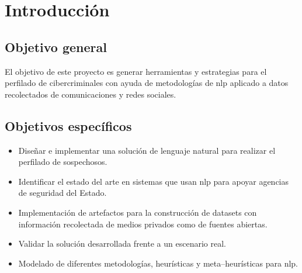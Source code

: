 \chapter{Introducción} %

\label{chIntroduction} %


\section{Objetivo general}
El objetivo de este proyecto es generar herramientas y estrategias para el perfilado de cibercriminales con ayuda de metodologías de \gls{nlp} aplicado a datos recolectados de comunicaciones y redes sociales.

\section{Objetivos específicos}
\begin{itemize}
  
\item Diseñar e implementar una solución de lenguaje natural para realizar el perfilado de sospechosos.

\item Identificar el estado del arte en sistemas que usan \gls{nlp} para apoyar agencias de seguridad del Estado.

\item Implementación de artefactos para la construcción de \gls{dataset}s con información recolectada de medios privados como de fuentes abiertas.

\item Validar la solución desarrollada frente a un escenario real.

\item Modelado de diferentes metodologías, heurísticas y meta--heurísticas para \gls{nlp}.

\end{itemize}
